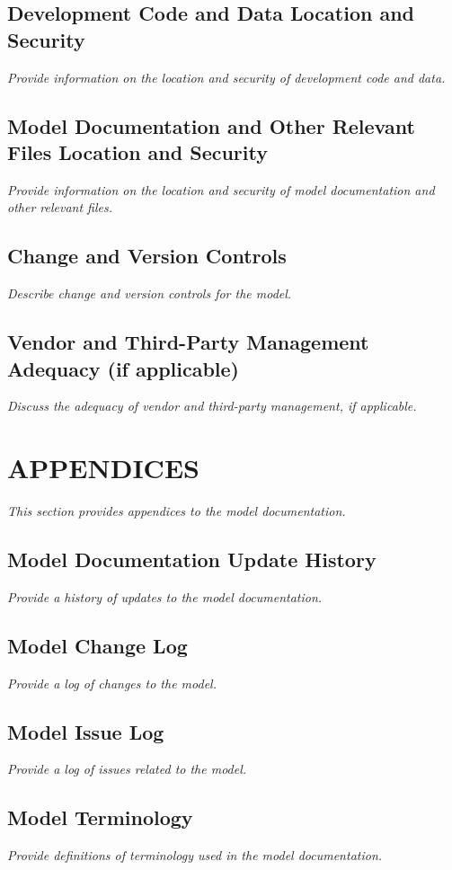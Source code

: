 \documentclass[12pt,letterpaper]{article}
\begin{document}
\subsection{Development Code and Data Location and Security}
\textit{Provide information on the location and security of development code and data.}

\subsection{Model Documentation and Other Relevant Files Location and Security}
\textit{Provide information on the location and security of model documentation and other relevant files.}

\subsection{Change and Version Controls}
\textit{Describe change and version controls for the model.}

\subsection{Vendor and Third-Party Management Adequacy (if applicable)}
\textit{Discuss the adequacy of vendor and third-party management, if applicable.}

\section{APPENDICES}
\textit{This section provides appendices to the model documentation.}

\subsection{Model Documentation Update History}
\textit{Provide a history of updates to the model documentation.}

\subsection{Model Change Log}
\textit{Provide a log of changes to the model.}

\subsection{Model Issue Log}
\textit{Provide a log of issues related to the model.}

\subsection{Model Terminology}
\textit{Provide definitions of terminology used in the model documentation.}
\end{document}
